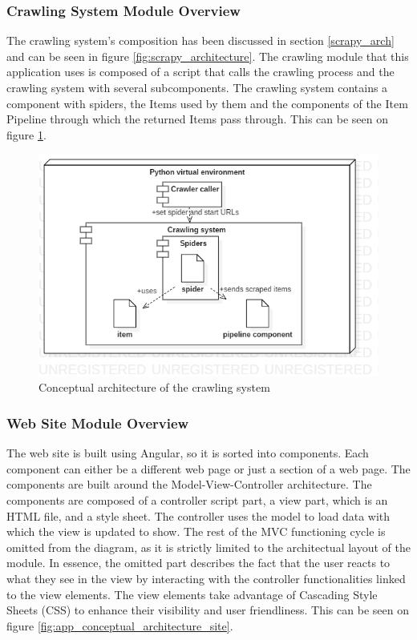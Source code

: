 \documentclass[12pt,a4paper,twoside]{report}
\begin{document}
\subsubsection{Crawling System Module Overview}

The crawling system's composition has been discussed in section \ref{scrapy_arch} and can be seen in figure \ref{fig:scrapy_architecture}. The crawling module that this application uses is composed of a script that calls the crawling process and the crawling system with several subcomponents. The crawling system contains a component with spiders, the Items used by them and the components of the Item Pipeline through which the returned Items pass through. This can be seen on figure \ref{fig:app_conceptual_architecture_crawl}.

\begin{figure}[ht]
  \centering
  \includegraphics[width=0.65\linewidth]{img/app_conceptual_architecture_crawl.png}
  \caption[]{Conceptual architecture of the crawling system}
  \label{fig:app_conceptual_architecture_crawl}
\end{figure}


\subsubsection{Web Site Module Overview}

The web site is built using Angular, so it is sorted into components. Each component can either be a different web page or just a section of a web page. The components are built around the Model-View-Controller architecture. The components are composed of a controller script part, a view part, which is an HTML file, and a style sheet. The controller uses the model to load data with which the view is updated to show. The rest of the MVC functioning cycle is omitted from the diagram, as it is strictly limited to the architectual layout of the module. In essence, the omitted part describes the fact that the user reacts to what they see in the view by interacting with the controller functionalities linked to the view elements. The view elements take advantage of Cascading Style Sheets (CSS) to enhance their visibility and user friendliness. This can be seen on figure \ref{fig:app_conceptual_architecture_site}.
\end{document}
